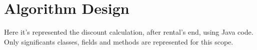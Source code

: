 \chapter{Algorithm Design}

Here it's represented the discount calculation, after rental's end, using Java code. Only significants classes, fields and methods are represented for this scope.
\\
\\
\\


\newpage

\newpage

\newpage

\newpage

\newpage
